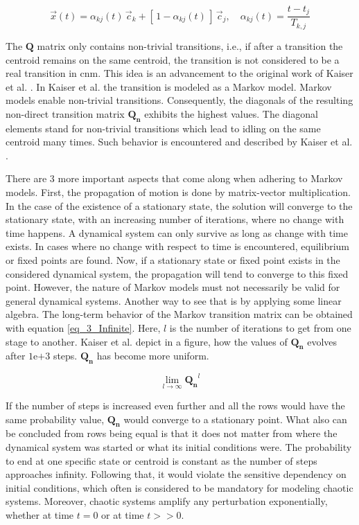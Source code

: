 \begin{equation}
    \vec{x}(t) = \alpha_{kj} (t) \, \vec{c}_k + [\, 1 - \alpha_{kj} (t)\,] \, \vec{c}_j, \quad \alpha_{kj} (t) = \frac{t-t_j}{T_{k,j}}
    \label{eq_34}
\end{equation}


The $\bm Q$ matrix only contains non-trivial transitions, i.e., 
if after a transition the centroid remains on the same centroid, the transition is not considered to be a real transition in \gls{cnm}. 
This idea 
is an advancement to the original work of Kaiser et al. \cite{Kaiser2014}.
In Kaiser et al. \cite{Kaiser2014} the transition is modeled 
as a Markov model. Markov models enable non-trivial transitions. Consequently,
the diagonals of the resulting non-direct transition matrix $\bm{Q_n}$  
exhibits the highest values. The diagonal elements stand for non-trivial 
transitions which lead to idling on the same centroid 
many times. Such behavior is encountered and described by Kaiser et al. \cite{Kaiser2014}.\newline 


There are 3 more important aspects that come along when 
adhering to Markov models. First, the propagation of motion is done 
by matrix-vector multiplication. In the case of the existence of a 
stationary state, the solution 
will converge to the stationary state, with an increasing number of iterations, where no change with time happens.
A dynamical system can only survive as long as change with time exists.
In cases where no change with respect to time is encountered, equilibrium 
or fixed points are found.
 Now, if a stationary state or fixed point 
exists in the considered dynamical system, the propagation 
will tend to converge to this fixed point. However, the nature of 
Markov models must not necessarily be valid for general dynamical systems. 
Another way to see that is by applying some linear algebra. The 
long-term behavior of the Markov transition matrix can be obtained 
with equation \eqref{eq_3_Infinite}. Here, $l$ is the number 
of iterations to get from one stage to another. Kaiser et al. 
\cite{Kaiser2014} depict in a figure, how the values of  
$\bm{Q_n}$ evolves after $1 \mathrm{e}{+3}$ steps. $\bm{Q_n}$ has 
become more uniform. 

\begin{equation}
    \label{eq_3_Infinite}
    \lim\limits_{l \to \infty} \bm{Q_n}^l
\end{equation}

If the number of steps is increased even further 
and all the rows would have the same probability value, 
$\bm{Q_n}$ would converge to a stationary point. What
also can be concluded from rows being equal is that it does not matter 
from where the dynamical system was started or what its 
initial conditions were. The probability 
to end at one specific state or centroid is constant as 
the number of steps approaches infinity. Following that,
it would violate the sensitive dependency on initial conditions, 
which often is considered to be mandatory for modeling chaotic systems. Moreover, chaotic
systems amplify any perturbation exponentially, whether at time 
$t = 0$ or at time $t>>0$. \newline 

